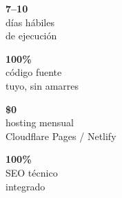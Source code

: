 \documentclass[11pt, a4paper]{article}
\begin{document}
  \noindent
  \begin{minipage}[t]{0.23\textwidth}
    \begin{center}
      {\color{mainblue}\Large\bfseries 7--10} \\ {\color{basicgray}\small días hábiles}
      \\ {\footnotesize\color{warmgray} de ejecución}
    \end{center}
  \end{minipage}
  \hfill
  \begin{minipage}[t]{0.23\textwidth}
    \begin{center}
      {\color{mainblue}\Large\bfseries 100\%} \\ {\color{basicgray}\small código fuente}
      \\ {\footnotesize\color{warmgray} tuyo, sin amarres}
    \end{center}
  \end{minipage}
  \hfill
  \begin{minipage}[t]{0.23\textwidth}
    \begin{center}
      {\color{mainblue}\Large\bfseries \$0} \\ {\color{basicgray}\small hosting mensual}
      \\ {\footnotesize\color{warmgray} Cloudflare Pages / Netlify}
    \end{center}
  \end{minipage}
  \hfill
  \begin{minipage}[t]{0.23\textwidth}
    \begin{center}
      {\color{mainblue}\Large\bfseries 100\%} \\ {\color{basicgray}\small SEO técnico}
      \\ {\footnotesize\color{warmgray} integrado}
    \end{center}
  \end{minipage}

  \vspace{8mm}
\end{document}
